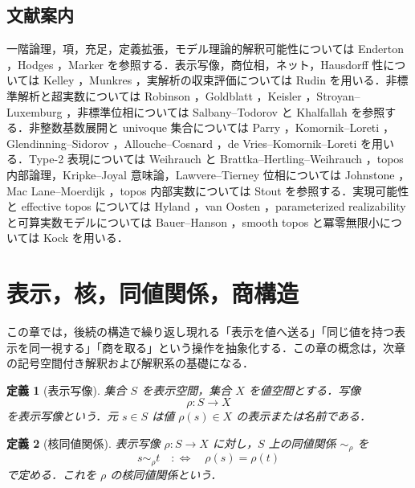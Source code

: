 \documentclass[a4paper,11pt]{ltjsarticle}
\theoremstyle{jpdef}
\newtheorem{definition}{定義}[section]
\theoremstyle{jpthm}
\begin{document}
\subsection*{文献案内}
一階論理，項，充足，定義拡張，モデル理論的解釈可能性については Enderton \cite{Enderton}，Hodges \cite{Hodges}，Marker \cite{Marker} を参照する．表示写像，商位相，ネット，Hausdorff 性については Kelley \cite{Kelley}，Munkres \cite{Munkres}，実解析の収束評価については Rudin \cite{Rudin} を用いる．非標準解析と超実数については Robinson \cite{Robinson}，Goldblatt \cite{Goldblatt}，Keisler \cite{Keisler}，Stroyan--Luxemburg \cite{StroyanLuxemburg}，非標準位相については Salbany--Todorov \cite{SalbanyTodorov} と Khalfallah \cite{Khalfallah} を参照する．非整数基数展開と univoque 集合については Parry \cite{Parry}，Komornik--Loreti \cite{KomornikLoreti}，Glendinning--Sidorov \cite{GlendinningSidorov}，Allouche--Cosnard \cite{AlloucheCosnard}，de Vries--Komornik--Loreti \cite{deVriesKomornikLoreti} を用いる．Type-2 表現については Weihrauch \cite{Weihrauch} と Brattka--Hertling--Weihrauch \cite{Brattka}，topos 内部論理，Kripke--Joyal 意味論，Lawvere--Tierney 位相については Johnstone \cite{Johnstone,JohnstoneElephant}，Mac Lane--Moerdijk \cite{MacLaneMoerdijk}，topos 内部実数については Stout \cite{Stout} を参照する．実現可能性と effective topos については Hyland \cite{Hyland}，van Oosten \cite{vanOosten}，parameterized realizability と可算実数モデルについては Bauer--Hanson \cite{BauerHanson}，smooth topos と冪零無限小については Kock \cite{Kock} を用いる．

\section{表示，核，同値関係，商構造}

この章では，後続の構造で繰り返し現れる「表示を値へ送る」「同じ値を持つ表示を同一視する」「商を取る」という操作を抽象化する．この章の概念は，次章の記号空間付き解釈および解釈系の基礎になる．

\begin{definition}[表示写像]
集合 \(S\) を表示空間，集合 \(X\) を値空間とする．写像
\[
  \rho:S\to X
\]
を表示写像という．元 \(s\in S\) は値 \(\rho(s)\in X\) の表示または名前である．
\end{definition}

\begin{definition}[核同値関係]
表示写像 \(\rho:S\to X\) に対し，\(S\) 上の同値関係 \(\sim_\rho\) を
\[
  s\sim_\rho t
  \quad:\Longleftrightarrow\quad
  \rho(s)=\rho(t)
\]
で定める．これを \(\rho\) の核同値関係という．
\end{definition}
\end{document}
